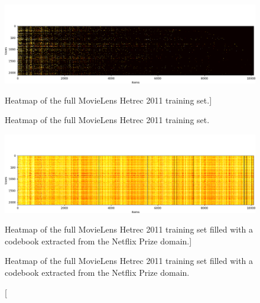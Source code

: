 \begin{figure}[htb]
\centering
\includegraphics[width=\textwidth]{pictures/movielens-full-target}
\caption
[Heatmap of the full MovieLens Hetrec 2011 training set.]
{\protect\raggedright Heatmap of the full MovieLens Hetrec 2011 training set.}
\includegraphics[width=\textwidth]{pictures/movielens-full-target-filled}
\caption
[Heatmap of the full MovieLens Hetrec 2011 training set filled with a codebook extracted from the Netflix Prize domain.]
{\protect\raggedright Heatmap of the full MovieLens Hetrec 2011 training set filled with a codebook extracted from the Netflix Prize domain.}
\end{figure}


